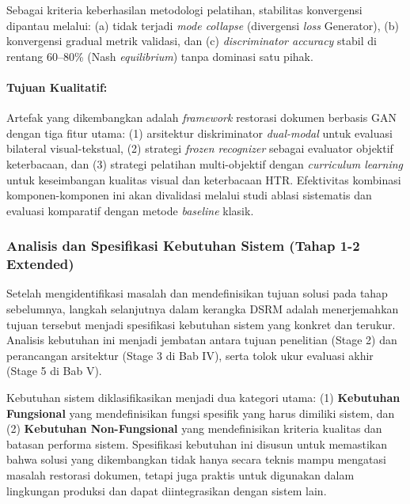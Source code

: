 \documentclass[12pt,a4paper]{book}
\begin{document}

Sebagai kriteria keberhasilan metodologi pelatihan, stabilitas konvergensi dipantau melalui: (a) tidak terjadi \textit{mode collapse} (divergensi \textit{loss} Generator), (b) konvergensi gradual metrik validasi, dan (c) \textit{discriminator accuracy} stabil di rentang 60--80\% (Nash \textit{equilibrium}) tanpa dominasi satu pihak.

\paragraph{Tujuan Kualitatif:}

Artefak yang dikembangkan adalah \textit{framework} restorasi dokumen berbasis GAN dengan tiga fitur utama: (1) arsitektur diskriminator \textit{dual-modal} untuk evaluasi bilateral visual-tekstual, (2) strategi \textit{frozen recognizer} sebagai evaluator objektif keterbacaan, dan (3) strategi pelatihan multi-objektif dengan \textit{curriculum learning} untuk keseimbangan kualitas visual dan keterbacaan HTR. Efektivitas kombinasi komponen-komponen ini akan divalidasi melalui studi ablasi sistematis dan evaluasi komparatif dengan metode \textit{baseline} klasik.

\subsubsection{Analisis dan Spesifikasi Kebutuhan Sistem (Tahap 1-2 Extended)}
\label{subsubsec:requirements-analysis}

Setelah mengidentifikasi masalah dan mendefinisikan tujuan solusi pada tahap sebelumnya, langkah selanjutnya dalam kerangka DSRM adalah menerjemahkan tujuan tersebut menjadi spesifikasi kebutuhan sistem yang konkret dan terukur. Analisis kebutuhan ini menjadi jembatan antara tujuan penelitian (Stage 2) dan perancangan arsitektur (Stage 3 di Bab IV), serta tolok ukur evaluasi akhir (Stage 5 di Bab V).

Kebutuhan sistem diklasifikasikan menjadi dua kategori utama: (1) \textbf{Kebutuhan Fungsional} yang mendefinisikan fungsi spesifik yang harus dimiliki sistem, dan (2) \textbf{Kebutuhan Non-Fungsional} yang mendefinisikan kriteria kualitas dan batasan performa sistem. Spesifikasi kebutuhan ini disusun untuk memastikan bahwa solusi yang dikembangkan tidak hanya secara teknis mampu mengatasi masalah restorasi dokumen, tetapi juga praktis untuk digunakan dalam lingkungan produksi dan dapat diintegrasikan dengan sistem lain.
\end{document}
